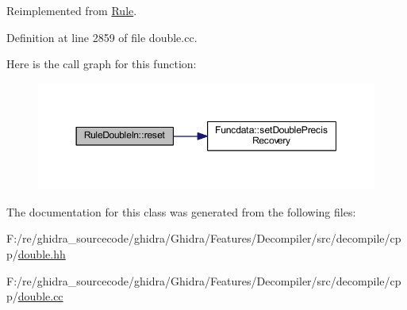 Reimplemented from \mbox{\hyperlink{class_rule_a1f074d593a6fefc79a5c07e4b3e13674}{Rule}}.



Definition at line 2859 of file double.\+cc.

Here is the call graph for this function\+:
\nopagebreak
\begin{figure}[H]
\begin{center}
\leavevmode
\includegraphics[width=350pt]{class_rule_double_in_a9feb1ec4c3183551094c745c169ee14e_cgraph}
\end{center}
\end{figure}


The documentation for this class was generated from the following files\+:\begin{DoxyCompactItemize}
\item 
F\+:/re/ghidra\+\_\+sourcecode/ghidra/\+Ghidra/\+Features/\+Decompiler/src/decompile/cpp/\mbox{\hyperlink{double_8hh}{double.\+hh}}\item 
F\+:/re/ghidra\+\_\+sourcecode/ghidra/\+Ghidra/\+Features/\+Decompiler/src/decompile/cpp/\mbox{\hyperlink{double_8cc}{double.\+cc}}\end{DoxyCompactItemize}
